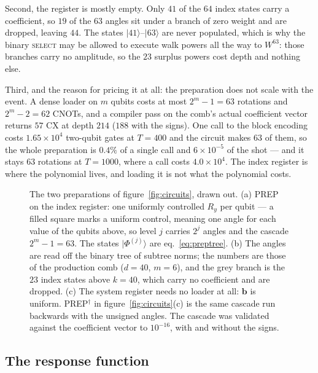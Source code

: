 \documentclass[11pt,a4paper]{article}
\begin{document}
Second, the register is mostly empty. Only $41$ of the $64$ index states carry
a coefficient, so $19$ of the $63$ angles sit under a branch of zero weight
and are dropped, leaving $44$. The states $|41\rangle$--$|63\rangle$ are never
populated, which is why the binary \textsc{select} may be allowed to execute
walk powers all the way to $W^{63}$: those branches carry no amplitude, so the
$23$ surplus powers cost depth and nothing else.

Third, and the reason for pricing it at all: the preparation does not scale
with the event. A dense loader on $m$ qubits costs at most $2^{m}-1=63$
rotations and $2^{m}-2=62$ CNOTs, and a compiler pass on the comb's actual
coefficient vector returns $57$ CX at depth $214$ ($188$ with the signs). One
call to the block encoding costs $1.65\times10^{4}$ two-qubit gates at
$T=400$ and the circuit makes $63$ of them, so the whole preparation is
$0.4\%$ of a single call and $6\times10^{-5}$ of the shot --- and it stays
$63$ rotations at $T=1000$, where a call costs $4.0\times10^{4}$. The index
register is where the polynomial lives, and loading it is not what the
polynomial costs.

\begin{figure}[H]
\centering
\captionsetup{width=0.96\textwidth}
\resizebox{\textwidth}{!}{}
\caption{The two preparations of figure~\ref{fig:circuits}, drawn out.
(a) PREP on the index register: one uniformly controlled $R_y$ per qubit ---
a filled square marks a uniform control, meaning one angle for each value of
the qubits above, so level $j$ carries $2^{j}$ angles and the cascade
$2^{m}-1=63$. The states $|\Phi^{(j)}\rangle$ are eq.~\eqref{eq:preptree}.
(b) The angles are read off the binary tree of subtree norms; the numbers are
those of the production comb ($d=40$, $m=6$), and the grey branch is the
$23$ index states above $k=40$, which carry no coefficient and are dropped.
(c) The system register needs no loader at all: $\mathbf{b}$ is uniform.
PREP$^{\dagger}$ in figure~\ref{fig:circuits}(c) is the same cascade run
backwards with the unsigned angles. The cascade was validated against the
coefficient vector to $10^{-16}$, with and without the signs.}
\label{fig:prep}
\end{figure}

\subsection{The response function}
\label{sec:onebit:response}
\end{document}
